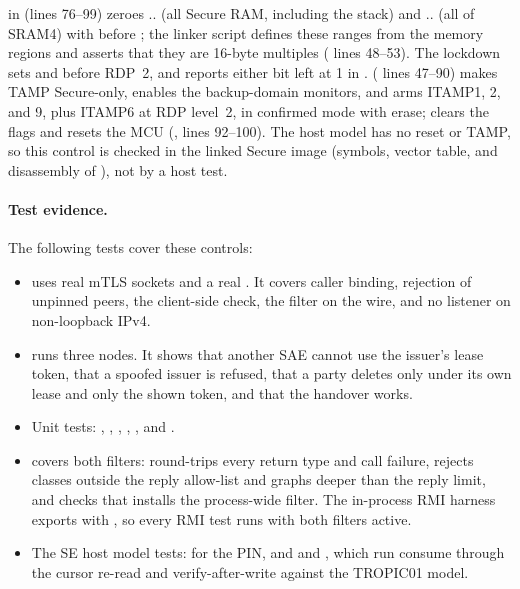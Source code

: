 \documentclass[11pt,a4paper]{article}
\begin{document}
\begin{description}[style=nextline,leftmargin=1.2em]
\item[C-8 SRAM erase on reset and tamper (firmware and option bytes)]\label{c:C-8}  in  (lines 76--99) zeroes .. (all Secure RAM, including the stack) and .. (all of SRAM4) with  before ; the linker script defines these ranges from the memory regions and asserts that they are 16-byte multiples ( lines 48--53). The lockdown sets  and  before RDP~2, and  reports either bit left at 1 in .  ( lines 47--90) makes TAMP Secure-only, enables the backup-domain monitors, and arms ITAMP1, 2, and 9, plus ITAMP6 at RDP level~2, in confirmed mode with erase;  clears the flags and resets the MCU (, lines 92--100). The host model has no reset or TAMP, so this control is checked in the linked Secure image (symbols, vector table, and disassembly of ), not by a host test.
\end{description}
\paragraph{Test evidence.} The following tests cover these controls:
\begin{itemize}
\item {} uses real mTLS sockets and a real . It covers caller binding, rejection of unpinned peers, the client-side check, the filter on the wire, and no listener on non-loopback IPv4.
\item {} runs three nodes. It shows that another SAE cannot use the issuer's lease token, that a spoofed issuer is refused, that a party deletes only under its own lease and only the shown token, and that the handover works.
\item Unit tests: , , , , , and .
\item {} covers both filters:  round-trips every  return type and call failure,  rejects classes outside the reply allow-list and graphs deeper than the reply limit, and  checks that  installs the process-wide filter. The in-process RMI harness exports with , so every RMI test runs with both filters active.
\item The SE host model tests:  for the PIN, and  and , which run consume through the cursor re-read and verify-after-write against the TROPIC01 model.
\end{itemize}
\end{document}
